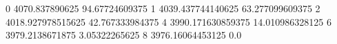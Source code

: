 0 4070.837890625 94.67724609375
1 4039.437744140625 63.277099609375
2 4018.927978515625 42.767333984375
4 3990.171630859375 14.010986328125
6 3979.2138671875 3.05322265625
8 3976.16064453125 0.0
